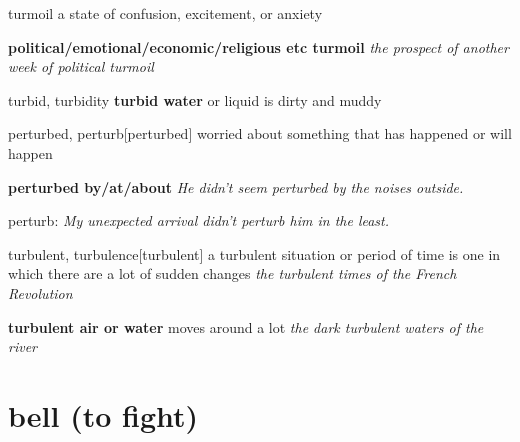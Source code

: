 \begin{DefWord}{turmoil}
    a state of confusion, excitement, or anxiety

    \textbf{political/emotional/economic/religious etc turmoil}
    \textit{the prospect of another week of political turmoil}

\end{DefWord}

\begin{DefWord}{turbid, turbidity}
    \textbf{turbid water} or liquid is dirty and muddy


\end{DefWord}

\begin{DefWord}{perturbed, perturb}[perturbed]
    worried about something that has happened or will happen

    \textbf{perturbed by/at/about}
    \textit{ He didn’t seem perturbed by the noises outside.}

    perturb: \textit{My unexpected arrival didn’t perturb him in the least.}
\end{DefWord}

\begin{DefWord}{turbulent, turbulence}[turbulent]
    a turbulent situation or period of time is one in which there are a lot of sudden changes
    \textit{the turbulent times of the French Revolution}

    \textbf{turbulent air or water} moves around a lot
    \textit{ the dark turbulent waters of the river}
\end{DefWord}

\section{bell (to fight)}

